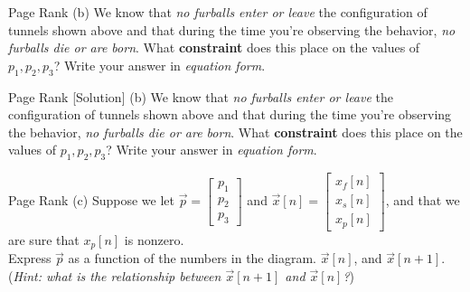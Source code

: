\begin{frame}{Page Rank}
    (b) We know that \textit{no furballs enter or leave} the configuration of tunnels shown above and that during the time you're observing the behavior, \textit{no furballs die or are born}. What \textbf{constraint} does this place on the values of $p_1, p_2, p_3$? Write your answer in \textit{equation form}.
\end{frame}

\begin{frame}{Page Rank [Solution]}
    (b) We know that \textit{no furballs enter or leave} the configuration of tunnels shown above and that during the time you're observing the behavior, \textit{no furballs die or are born}. What \textbf{constraint} does this place on the values of $p_1, p_2, p_3$? Write your answer in \textit{equation form}.\\[2ex]
\end{frame}

\begin{frame}{Page Rank}
    (c) Suppose we let $\vec{p} = \begin{bmatrix}
        p_1 \\ p_2 \\ p_3
    \end{bmatrix}$ and $\vec{x}[n] = \begin{bmatrix}
        x_f[n] \\ x_s[n] \\ x_p[n]
    \end{bmatrix}$, and that we are sure that $x_p[n]$ is nonzero. \\[2ex]
    Express $\vec{p}$ as a function of the numbers in the diagram. $\vec{x}[n]$, and $\vec{x}[n + 1]$. (\textit{Hint: what is the relationship between $\vec{x}[n + 1]$ and $\vec{x}[n]$?})
\end{frame}

